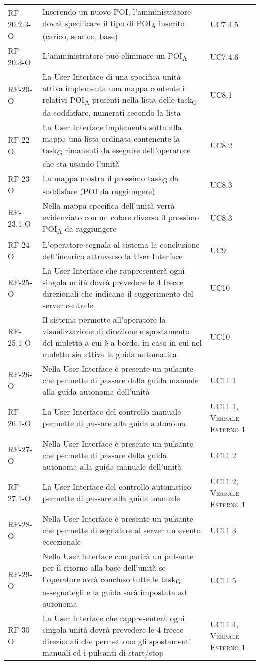 \begin{longtable}{ 
		>{}p{} 
		>{}p{}
		>{\centering}p{} }
RF-20.2.3-O	&	Inserendo un nuovo POI, l'amministratore dovrà specificare il tipo di \acrshort{POI}\textsubscript{A} inserito (carico, scarico, base)	&	UC7.4.5\tabularnewline
RF-20.3-O		&	L'amministratore può eliminare un \acrshort{POI}\textsubscript{A}	&	UC7.4.6\tabularnewline
RF-20-O		&	La User Interface di una specifica unità attiva implementa una mappa contente i relativi \acrshort{POI}\textsubscript{A} presenti nella lista delle \gls{task}\textsubscript{G} da soddisfare, numerati secondo la lista	&	UC8.1\tabularnewline
RF-22-O		&	La User Interface implementa sotto alla mappa una lista ordinata contenente la \gls{task}\textsubscript{G} rimanenti da eseguire dell'operatore che sta usando l'unità	&	UC8.2\tabularnewline
RF-23-O		&	La mappa mostra il prossimo \gls{task}\textsubscript{G} da soddisfare (POI da raggiungere) 	&	UC8.3\tabularnewline
RF-23.1-O		&	Nella mappa specifica dell'unità verrà evidenziato con un colore diverso il prossimo \acrshort{POI}\textsubscript{A} da raggiungere	&	UC8.3\tabularnewline
RF-24-O		&	L'operatore segnala al sistema la conclusione dell'incarico attraverso la User Interface	&	UC9\tabularnewline				
RF-25-O		&	La User Interface che rappresenterà ogni singola unità dovrà prevedere le 4 frecce direzionali che indicano il suggerimento del server centrale	&	UC10\tabularnewline
RF-25.1-O		&	Il sistema permette all'operatore la visualizzazione di direzione e spostamento del muletto a cui è a bordo, in caso in cui nel muletto sia attiva la guida automatica 	&	UC10\tabularnewline				
RF-26-O		&	Nella User Interface è presente un pulsante che permette di passare dalla guida manuale alla guida autonoma dell'unità	&	UC11.1\tabularnewline
RF-26.1-O		&	La User Interface del controllo manuale permette di passare alla guida autonoma	&	UC11.1, \textsc{\textsc{Verbale Esterno 1}}\tabularnewline
RF-27-O		&	Nella User Interface è presente un pulsante che permette di passare dalla guida autonoma alla guida manuale dell'unità	&	UC11.2\tabularnewline
RF-27.1-O		&	La User Interface del controllo automatico permette di passare alla guida manuale	&	UC11.2, \textsc{\textsc{Verbale Esterno 1}}\tabularnewline
RF-28-O		&	Nella User Interface è presente un pulsante che permette di segnalare al server un evento eccezionale	&	UC11.3\tabularnewline
RF-29-O		&	Nella User Interface comparirà  un pulsante per il ritorno alla base dell'unità se l'operatore avrà concluso tutte le \gls{task}\textsubscript{G} assegnategli e la guida sarà impostata ad autonoma 	&	UC11.5\tabularnewline 
RF-30-O		&	La User Interface che rappresenterà ogni singola unità dovrà prevedere le 4 frecce direzionali che permettono gli spostamenti manuali ed i pulsanti di start/stop	&	UC11.4, \textsc{\textsc{Verbale Esterno 1}}\tabularnewline

\end{longtable}
